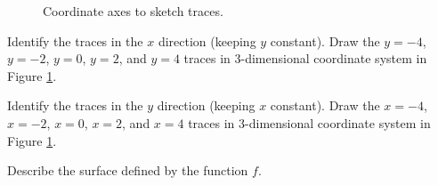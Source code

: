 \begin{activity} \label{A:9.1.7}

 \begin{figure}[ht]
\begin{center}
\caption{Coordinate axes to sketch traces.}
\label{F:9.1.traces_activity_1}
\end{center}
\end{figure}
   \ba
   \item Identify the traces in the $x$ direction (keeping $y$ constant). Draw the $y=-4$, $y=-2$, $y=0$, $y=2$, and $y=4$ traces in 3-dimensional coordinate system in Figure \ref{F:9.1.traces_activity_1}.

    \item Identify the traces in the $y$ direction (keeping $x$ constant). Draw the $x=-4$, $x=-2$, $x=0$, $x=2$, and $x=4$ traces in 3-dimensional coordinate system in Figure \ref{F:9.1.traces_activity_1}.

    \item Describe the surface defined by the function $f$.

     \ea

\end{activity}
\begin{smallhint}

\end{smallhint}
\begin{bighint}

\end{bighint}
\begin{activitySolution}


\end{activitySolution}
\aftera 